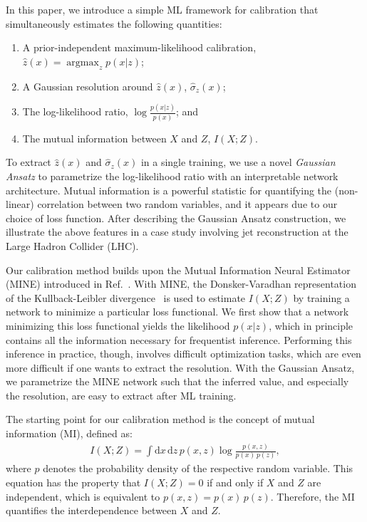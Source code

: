 \documentclass[prl,twocolumn,superscriptaddress,longbibliography,preprintnumbers,floatfix,nofootinbib]{revtex4-1}
\DeclareMathOperator*{\argmax}{argmax}
\DeclareRobustCommand{\Ref}[1]{Ref.~\cite{#1}}
\newcommand{\GaussianAnsatz}{{Gaussian Ansatz}\xspace}
\begin{document}
In this paper, we introduce a simple ML framework for calibration that simultaneously estimates the following quantities:
%
\begin{enumerate}
    \item A prior-independent maximum-likelihood calibration, $\hat{z}(x)=\argmax_z p(x|z)$;
    \item A Gaussian resolution around $\hat{z}(x)$, $\hat{\sigma}_z(x)$;
    \item The log-likelihood ratio, $\log \frac{p(x|z)}{p(x)}$; and
    \item The mutual information between $X$ and $Z$, $I(X;Z)$.
\end{enumerate}
%
To extract $\hat{z}(x)$ and $\hat{\sigma}_z(x)$ in a single training, we use a novel \textit{\GaussianAnsatz} to parametrize the log-likelihood ratio with an interpretable network architecture.
%
Mutual information is a powerful statistic for quantifying the (non-linear) correlation between two random variables, and it appears due to our choice of loss function.
%
After describing the \GaussianAnsatz construction, we illustrate the above features in a case study involving jet reconstruction at the Large Hadron Collider (LHC).


Our calibration method builds upon the  Mutual Information Neural Estimator (MINE) introduced in \Ref{belghazi2018mine}.
%
With MINE, the Donsker-Varadhan representation~\cite{Donsker1975AsymptoticEO} of the Kullback-Leibler divergence~\cite{kullback1951information} is used to estimate $I(X;Z)$ by training a network to minimize a particular loss functional.
%
We first show that a network minimizing this loss functional yields the likelihood $p(x|z)$, which in principle contains all the information necessary for frequentist inference.
%
Performing this inference in practice, though, involves difficult optimization tasks, which are even more difficult if one wants to extract the resolution.
%
With the \GaussianAnsatz, we parametrize the MINE network such that the inferred value, and especially the resolution, are easy to extract after ML training.



The starting point for our calibration method is the concept of mutual information (MI), defined as:
%
\begin{align}
    \label{eq:MI_definition}
    I(X;Z) = \int\text{d}x\,\text{d}z\, p(x,z) \log\frac{p(x,z)}{p(x)\,p(z)} ,
\end{align}
%
where $p$ denotes the probability density of the respective random variable.
%
This equation has the property that $I(X;Z)=0$ if and only if $X$ and $Z$ are independent, which is equivalent to $p(x,z)=p(x)\, p(z)$.
%
Therefore, the MI quantifies the interdependence between $X$ and $Z$. 
\end{document}
